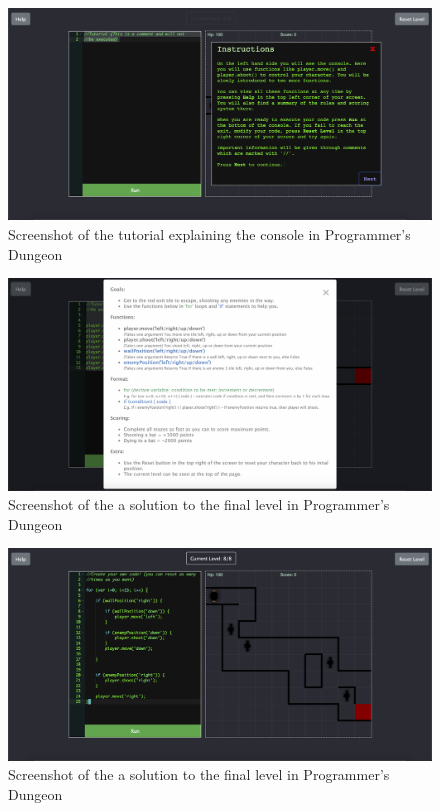 \documentclass[a4paper,11.5pt]{report}
\numberwithin{figure}{section}
\numberwithin{table}{section}
\numberwithin{equation}{section}
\numberwithin{equation}{section}
\begin{document}
\begin{figure}[H]
 \centering
    \includegraphics[width=1\textwidth]{tutorialconsole}
       \captionsetup{justification=centering}
\caption{Screenshot of the tutorial explaining the console in Programmer's Dungeon}
\label{fig:tutorialconsole}
\end{figure}

\begin{figure}[H]
 \centering
    \includegraphics[width=1\textwidth]{helpsection}
       \captionsetup{justification=centering}
\caption{Screenshot of the a solution to the final level in Programmer's Dungeon}
\label{fig:helpsection}
\end{figure}


\begin{figure}[H]
 \centering
    \includegraphics[width=1\textwidth]{finallevel}
       \captionsetup{justification=centering}
\caption{Screenshot of the a solution to the final level in Programmer's Dungeon}
\label{fig:finallevel}
\end{figure}
\end{document}
